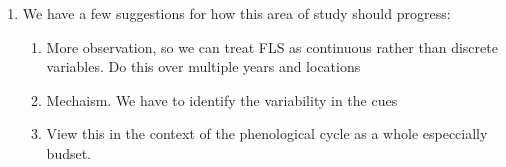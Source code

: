 \documentclass{article}\usepackage[]{graphicx}\usepackage[]{color}
\begin{document}
\begin{enumerate}
\begin{enumerate}
\end{enumerate}
\item We have a few suggestions for how this area of study should progress:
\begin{enumerate}
\item More observation, so we can treat FLS as continuous rather than discrete variables. Do this over multiple years and locations
\item Mechaism. We have to identify the variability in the cues
\item View this in the context of the phenological cycle as a whole especcially  budset.
\end{enumerate}
\end{enumerate}
\end{document}
